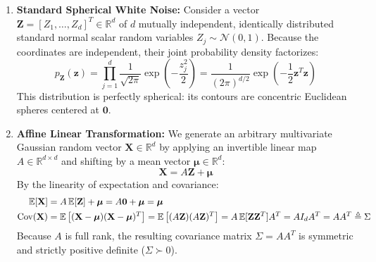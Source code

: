 \begin{enumerate}
    \item \textbf{Standard Spherical White Noise:} Consider a vector $\mathbf{Z} = [Z_1, \dots, Z_d]^T \in \mathbb{R}^d$ of $d$ mutually independent, identically distributed standard normal scalar random variables $Z_j \sim \mathcal{N}(0, 1)$. Because the coordinates are independent, their joint probability density factorizes:
    \begin{equation}
    p_\mathbf{Z}(\mathbf{z}) = \prod_{j=1}^d \frac{1}{\sqrt{2\pi}} \exp\left( -\frac{z_j^2}{2} \right) = \frac{1}{(2\pi)^{d/2}} \exp\left( -\frac{1}{2}\mathbf{z}^T\mathbf{z} \right)
    \label{eq:standard_normal_pdf}
    \end{equation}
    This distribution is perfectly spherical: its contours are concentric Euclidean spheres centered at $\mathbf{0}$.

    \item \textbf{Affine Linear Transformation:} We generate an arbitrary multivariate Gaussian random vector $\mathbf{X} \in \mathbb{R}^d$ by applying an invertible linear map $A \in \mathbb{R}^{d \times d}$ and shifting by a mean vector $\boldsymbol{\mu} \in \mathbb{R}^d$:
    \begin{equation}
    \mathbf{X} = A\mathbf{Z} + \boldsymbol{\mu}
    \label{eq:affine_gaussian_gen}
    \end{equation}
    By the linearity of expectation and covariance:
    \begin{align}
    \operatorname{\mathbb{E}}[\mathbf{X}] &= A\operatorname{\mathbb{E}}[\mathbf{Z}] + \boldsymbol{\mu} = A\mathbf{0} + \boldsymbol{\mu} = \boldsymbol{\mu} \\
    \operatorname{Cov}(\mathbf{X}) &= \operatorname{\mathbb{E}}\big[(\mathbf{X} - \boldsymbol{\mu})(\mathbf{X} - \boldsymbol{\mu})^T\big] = \operatorname{\mathbb{E}}\big[(A\mathbf{Z})(A\mathbf{Z})^T\big] = A \operatorname{\mathbb{E}}[\mathbf{Z}\mathbf{Z}^T] A^T = A I_d A^T = A A^T \triangleq \Sigma
    \end{align}
    Because $A$ is full rank, the resulting covariance matrix $\Sigma = AA^T$ is symmetric and strictly positive definite ($\Sigma \succ 0$).


\end{enumerate}
